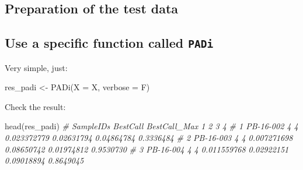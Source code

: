 \documentclass[
  12pt,
]{book}
\newenvironment{Shaded}{\begin{snugshade}}{\end{snugshade}}
\newcommand{\AttributeTok}[1]{\textcolor[rgb]{0.77,0.63,0.00}{#1}}
\newcommand{\CommentTok}[1]{\textcolor[rgb]{0.56,0.35,0.01}{\textit{#1}}}
\newcommand{\FunctionTok}[1]{\textcolor[rgb]{0.00,0.00,0.00}{#1}}
\newcommand{\NormalTok}[1]{#1}
\newcommand{\OtherTok}[1]{\textcolor[rgb]{0.56,0.35,0.01}{#1}}
\newcommand{\SpecialCharTok}[1]{\textcolor[rgb]{0.00,0.00,0.00}{#1}}
\begin{document}
\hypertarget{preparation-of-the-test-data-1}{%
\subsection{Preparation of the test data}\label{preparation-of-the-test-data-1}}

\begin{Shaded}
\end{Shaded}

\hypertarget{use-a-specific-function-called-padi}{%
\subsection{\texorpdfstring{Use a specific function called \texttt{PADi}}{Use a specific function called PADi}}\label{use-a-specific-function-called-padi}}

Very simple, just:

\begin{Shaded}
\begin{Highlighting}[]
\NormalTok{res\_padi }\OtherTok{\textless{}{-}} \FunctionTok{PADi}\NormalTok{(}\AttributeTok{X =}\NormalTok{ X, }\AttributeTok{verbose =}\NormalTok{ F)}
\end{Highlighting}
\end{Shaded}

Check the result:

\begin{Shaded}
\begin{Highlighting}[]
\FunctionTok{head}\NormalTok{(res\_padi)}
\CommentTok{\#   SampleIDs BestCall BestCall\_Max           1          2          3         4}
\CommentTok{\# 1 PB{-}16{-}002        4            4 0.023372779 0.02631794 0.04864784 0.3336484}
\CommentTok{\# 2 PB{-}16{-}003        4            4 0.007271698 0.08650742 0.01974812 0.9530730}
\CommentTok{\# 3 PB{-}16{-}004        4            4 0.011559768 0.02922151 0.09018894 0.8649045}
\end{Highlighting}
\end{Shaded}
\end{document}
